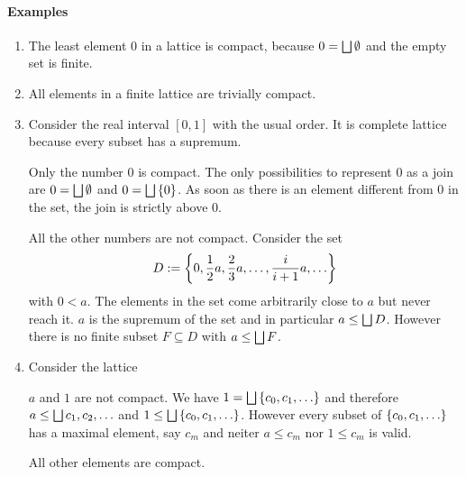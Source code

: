 \paragraph{Examples}
\begin{enumerate}
    \item The least element $0$ in a lattice is compact, because $0 = \bigsqcup
        \emptyset$ and the empty set is finite.

    \item All elements in a finite lattice are trivially compact.

    \item Consider the real interval $[0,1]$ with the usual order. It is
        complete lattice because every subset has a supremum.

        Only the number $0$ is compact. The only possibilities to represent $0$
        as a join are $0 = \bigsqcup \emptyset$ and $0 = \bigsqcup \left\{0\right\}$. As
        soon as there is an element different from $0$ in the set, the join is
        strictly above $0$.

        All the other numbers are not compact. Consider the set
        $$
        D := \left\{0, \frac 1 2 a, \frac 2 3 a, \ldots, \frac i {i+1} a, \ldots\right\}
        $$
        with $0 < a$. The elements in the set come arbitrarily close to $a$ but
        never reach it. $a$ is the supremum of the set and in particular $a \le
        \bigsqcup D$. However there is no finite subset $F \subseteq D$ with $a
        \le \bigsqcup F$.

    \item Consider the lattice


        $a$ and $1$ are not compact. We have $1 = \bigsqcup \left\{c_0, c_1,
        \ldots\right\}$ and therefore $a \le \bigsqcup{c_1, c_2, \ldots}$
        and $1 \le \bigsqcup \left\{c_0, c_1, \ldots\right\}$. However every subset of
        $\left\{c_0, c_1, \ldots\right\}$ has a maximal element, say $c_m$ and neiter $a
        \le c_m$ nor $1 \le c_m$ is valid.

        All other elements are compact.

\end{enumerate}









